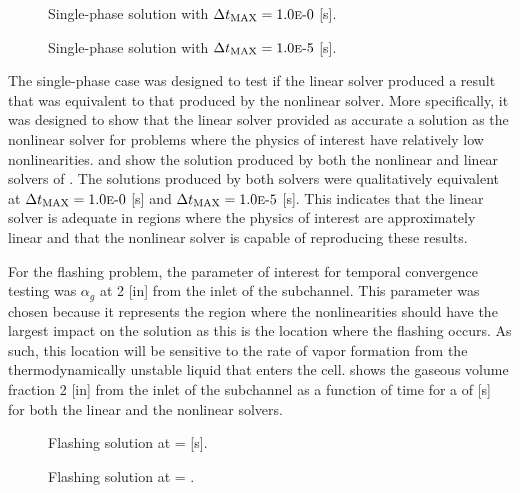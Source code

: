\begin{figure}[h!tb]
\centering

\caption{Single-phase solution with $\dtmax{} = \expneg{1.0}{0}$ [s].}
\label{fig:single1pt000em0}
\end{figure}

\begin{figure}[h!tb]
\centering

\caption{Single-phase solution with $\dtmax{} = \expneg{1.0}{5}$ [s].}
\label{fig:single1pt000em5}
\end{figure}

The single-phase case was designed to test if the linear solver produced a result that was equivalent to that produced by the nonlinear solver.
More specifically, it was designed to show that the linear solver provided as accurate a solution as the nonlinear solver for problems where the physics of interest have relatively low nonlinearities.
 and  show the solution produced by both the nonlinear and linear solvers of \cobra{}.
The solutions produced by both solvers were qualitatively equivalent at $\dtmax{} = \expneg{1.0}{0}$ [s] and $\dtmax{} = \expneg{1.0}{5}$ [s].
This indicates that the linear solver is adequate in regions where the physics of interest are approximately linear and that the nonlinear solver is capable of reproducing these results.

For the flashing problem, the parameter of interest for temporal convergence testing was $\alpha_g$ at 2 [in] from the inlet of the subchannel.
This parameter was chosen because it represents the region where the nonlinearities should have the largest impact on the solution as this is the location where the flashing occurs.
As such, this location will be sensitive to the rate of vapor formation from the thermodynamically unstable liquid that enters the cell.
 shows the gaseous volume fraction 2 [in] from the inlet of the subchannel as a function of time for a \dtmax{} of  [s] for both the linear and the nonlinear solvers.

\begin{figure}[h!tb]
\centering

\caption{Flashing solution at \dtmax{} =  {[s]}.}
\label{fig:flashing1pt0000em0}
\end{figure}

\begin{figure}[h!tb]
\centering

\caption{Flashing solution at \dtmax{} = .}
\label{fig:flashing1pt0000em5}
\end{figure}

